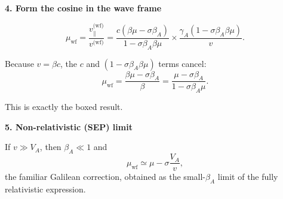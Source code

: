 \begin{tcolorbox}[colback=white, colframe=black, title={Step-by-Step Derivation of Pitch–Angle Cosine in the Wave Frame}]
\medskip

\textbf{4. Form the cosine in the wave frame}

\[
\mu_{\text{wf}}
= \frac{v_\parallel^{\text{(wf)}}}{v^{\text{(wf)}}}
= \frac{c(\beta \mu - \sigma \beta_A)}{1 - \sigma \beta_A \beta \mu}
\times
\frac{\gamma_A (1 - \sigma \beta_A \beta \mu)}{v}.
\]

Because $v = \beta c$, the $c$ and $(1 - \sigma \beta_A \beta \mu)$ terms cancel:
\begin{equation}
\mu_{\text{wf}}
= \frac{\beta \mu - \sigma \beta_A}{\beta}
= \frac{\mu - \sigma \beta_A}{1 - \sigma \beta_A \mu}.
\tag{4}
\end{equation}

This is exactly the boxed result.

\medskip

\textbf{5. Non-relativistic (SEP) limit}

If $v \gg V_A$, then $\beta_A \ll 1$ and
\[
\mu_{\text{wf}} \simeq \mu - \sigma \frac{V_A}{v},
\]
the familiar Galilean correction, obtained as the small-$\beta_A$ limit of the fully relativistic expression.



\end{tcolorbox}
